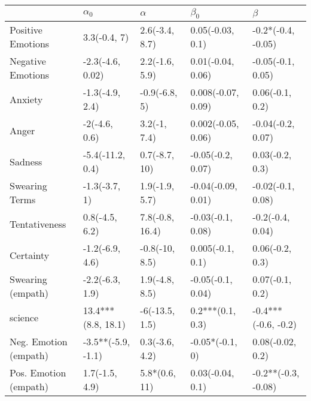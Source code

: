 \begin{tabular}{lllll}
\toprule
{} &          $\alpha_0$ &         $\alpha$ &           $\beta_0$ &              $\beta$ \\
\midrule
Positive Emotions     &        3.3(-0.4, 7) &   2.6(-3.4, 8.7) &    0.05(-0.03, 0.1) &   -0.2*(-0.4, -0.05) \\
Negative Emotions     &    -2.3(-4.6, 0.02) &   2.2(-1.6, 5.9) &   0.01(-0.04, 0.06) &    -0.05(-0.1, 0.05) \\
Anxiety               &     -1.3(-4.9, 2.4) &    -0.9(-6.8, 5) &  0.008(-0.07, 0.09) &      0.06(-0.1, 0.2) \\
Anger                 &       -2(-4.6, 0.6) &     3.2(-1, 7.4) &  0.002(-0.05, 0.06) &    -0.04(-0.2, 0.07) \\
Sadness               &    -5.4(-11.2, 0.4) &    0.7(-8.7, 10) &   -0.05(-0.2, 0.07) &      0.03(-0.2, 0.3) \\
Swearing Terms        &       -1.3(-3.7, 1) &   1.9(-1.9, 5.7) &  -0.04(-0.09, 0.01) &    -0.02(-0.1, 0.08) \\
Tentativeness         &      0.8(-4.5, 6.2) &  7.8(-0.8, 16.4) &   -0.03(-0.1, 0.08) &     -0.2(-0.4, 0.04) \\
Certainty             &     -1.2(-6.9, 4.6) &   -0.8(-10, 8.5) &    0.005(-0.1, 0.1) &      0.06(-0.2, 0.3) \\
Swearing (empath)     &     -2.2(-6.3, 1.9) &   1.9(-4.8, 8.5) &   -0.05(-0.1, 0.04) &      0.07(-0.1, 0.2) \\
science               &  13.4***(8.8, 18.1) &   -6(-13.5, 1.5) &    0.2***(0.1, 0.3) &  -0.4***(-0.6, -0.2) \\
Neg. Emotion (empath) &  -3.5**(-5.9, -1.1) &   0.3(-3.6, 4.2) &     -0.05*(-0.1, 0) &     0.08(-0.02, 0.2) \\
Pos. Emotion (empath) &      1.7(-1.5, 4.9) &    5.8*(0.6, 11) &    0.03(-0.04, 0.1) &  -0.2**(-0.3, -0.08) \\
\bottomrule
\end{tabular}
